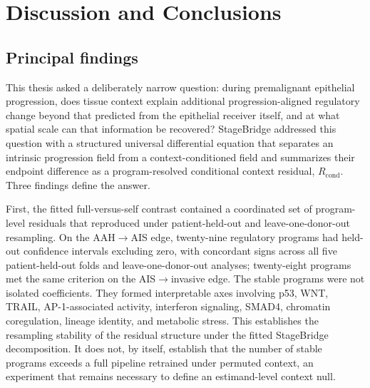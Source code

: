 
\chapter{Discussion and Conclusions}
\label{chap:discussion}

\section{Principal findings}
\label{sec:principal-findings}

This thesis asked a deliberately narrow question: during premalignant epithelial progression, does tissue context explain additional progression-aligned regulatory change beyond that predicted from the epithelial receiver itself, and at what spatial scale can that information be recovered? StageBridge addressed this question with a structured universal differential equation that separates an intrinsic progression field from a context-conditioned field and summarizes their endpoint difference as a program-resolved conditional context residual, $R_{\mathrm{cond}}$. Three findings define the answer.

First, the fitted full-versus-self contrast contained a coordinated set of program-level residuals that reproduced under patient-held-out and leave-one-donor-out resampling. On the AAH$\rightarrow$AIS edge, twenty-nine regulatory programs had held-out confidence intervals excluding zero, with concordant signs across all five patient-held-out folds and leave-one-donor-out analyses; twenty-eight programs met the same criterion on the AIS$\rightarrow$invasive edge. The stable programs were not isolated coefficients. They formed interpretable axes involving p53, WNT, TRAIL, AP-1-associated activity, interferon signaling, SMAD4, chromatin coregulation, lineage identity, and metabolic stress. This establishes the resampling stability of the residual structure under the fitted StageBridge decomposition. It does not, by itself, establish that the number of stable programs exceeds a full pipeline retrained under permuted context, an experiment that remains necessary to define an estimand-level context null.

